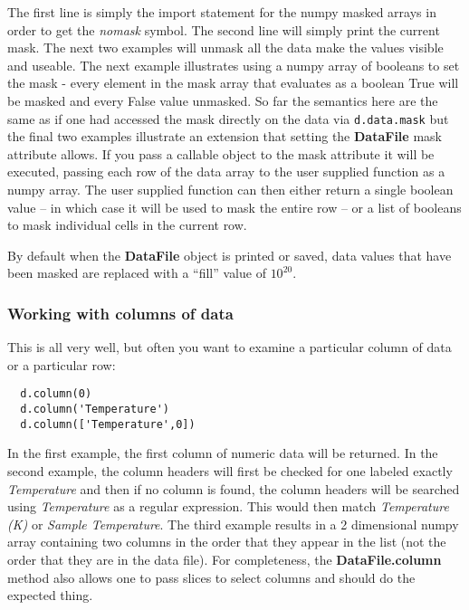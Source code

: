 \documentclass[a4paper,11pt]{scrartcl}
\begin{document}
The first line is simply the import statement for the numpy masked arrays in order to get the \textit{nomask} symbol. The second line will simply print the current mask. The next two examples will unmask all the data \ie make the values visible and useable. The next example illustrates using a numpy array of booleans to set the mask - every element in the mask array that evaluates as a boolean True will be masked and every False value unmasked. So far the semantics here are the same as if one had accessed the mask directly on the data via \verb'd.data.mask' but the final two examples illustrate an extension that setting the \textbf{DataFile} mask attribute allows. If you pass a callable object to the mask attribute it will be executed, passing each row of the data array to the user supplied function as a numpy array. The user supplied function can then either return a single boolean value -- in which case it will be used to mask the entire row -- or a list of booleans to mask individual cells in the current row.

By default when the \textbf{DataFile} object is printed or saved, data values that have been masked are replaced with a ``fill'' value of $10^{20}$.


\subsubsection{Working with columns of data}

This is all very well, but often you want to examine a particular column of data
or a particular row:
\begin{lstlisting}
  d.column(0)
  d.column('Temperature')
  d.column(['Temperature',0])
\end{lstlisting}
In the first example, the first column of numeric data will be returned. In the
second example, the column headers will first be checked for one labeled exactly
\textit{Temperature} and then if no column is found, the column headers will be
searched using \textit{Temperature} as a regular expression. This would then
match \textit{Temperature (K)} or \textit{Sample Temperature}.  The third
example results in a 2 dimensional numpy array containing two columns in the
order that they appear in the list (\ie not the order that they are in the data
file). For completeness, the \textbf{DataFile.column} method also allows one to
pass slices to select columns and should do the expected thing.
\end{document}
